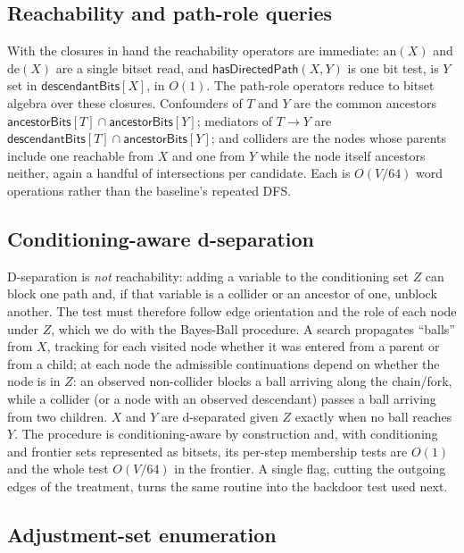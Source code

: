 \subsection{Reachability and path-role queries}\label{sec:index:reach}

With the closures in hand the reachability operators are immediate:
$\mathrm{an}(X)$ and $\mathrm{de}(X)$ are a single bitset read, and
$\textsf{hasDirectedPath}(X,Y)$ is one bit test, is $Y$ set in
$\textsf{descendantBits}[X]$, in $O(1)$. The path-role operators reduce to
bitset algebra over these closures. Confounders of $T$ and $Y$ are the common
ancestors $\textsf{ancestorBits}[T]\cap\textsf{ancestorBits}[Y]$; mediators of
$T\!\to\!Y$ are $\textsf{descendantBits}[T]\cap\textsf{ancestorBits}[Y]$; and
colliders are the nodes whose parents include one reachable from $X$ and one from
$Y$ while the node itself ancestors neither, again a handful of intersections
per candidate. Each is $O(V/64)$ word operations rather than the baseline's
repeated DFS.

\subsection{Conditioning-aware d-separation}\label{sec:index:dsep}

D-separation is \emph{not} reachability: adding a variable to the conditioning set
$Z$ can block one path and, if that variable is a collider or an ancestor of one,
unblock another. The test must therefore follow edge orientation and the role of
each node under $Z$, which we do with the Bayes-Ball procedure. A search
propagates ``balls'' from $X$, tracking for each visited node whether it was
entered from a parent or from a child; at each node the admissible continuations
depend on whether the node is in $Z$: an observed non-collider blocks a ball
arriving along the chain/fork, while a collider (or a node with an observed
descendant) passes a ball arriving from two children. $X$ and $Y$ are
d-separated given $Z$ exactly when no ball reaches $Y$. The procedure is
conditioning-aware by construction and, with conditioning and frontier sets
represented as bitsets, its per-step membership tests are $O(1)$ and the whole
test $O(V/64)$ in the frontier. A single flag, cutting the outgoing edges of the
treatment, turns the same routine into the backdoor test used next.

\subsection{Adjustment-set enumeration}\label{sec:index:adj}

